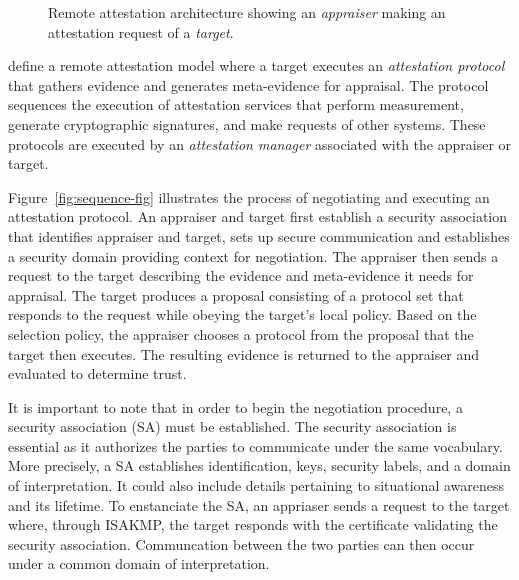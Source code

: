 \documentclass[sigconf,authordraft]{acmart}
\begin{document}
\begin{figure}[hbtp]
  \centering 
  \caption[Attestation architecture]{Remote attestation architecture
    showing an \emph{appraiser} making an attestation request of a
    \emph{target}.}
  \label{fig:architecture-fig}
\end{figure}

\citet{Coker::Principles-of-R,Coker:08:Attestation:-Ev} define a
remote attestation model where a target executes an \emph{attestation
  protocol} that gathers evidence and generates meta-evidence for
appraisal.  The protocol sequences the execution of attestation
services that perform measurement, generate cryptographic signatures,
and make requests of other systems. These protocols are executed by an
\emph{attestation manager} associated with the appraiser or target.


Figure~\ref{fig:sequence-fig} illustrates the process of negotiating
and executing an attestation protocol.  An appraiser and target first
establish a security association that identifies appraiser and target,
sets up secure communication and establishes a security domain
providing context for negotiation.  The appraiser then sends a request
to the target describing the evidence and meta-evidence it needs for
appraisal.  The target produces a proposal consisting of a protocol
set that responds to the request while obeying the target's local
policy. Based on the selection policy, the appraiser chooses a protocol from the proposal that the
target then executes.  The resulting evidence is returned to the
appraiser and evaluated to determine trust.


It is important to note that in order to begin the negotiation
procedure, a security association (SA) must be established. The
security association is essential as it authorizes the parties to
communicate under the same vocabulary. More precisely, a SA
establishes identification, keys, security labels, and a domain of
interpretation. It could also include details pertaining to
situational awareness and its lifetime. To enstanciate the SA, an
appriaser sends a request to the target where, through ISAKMP, the
target responds with the certificate validating the security
association. Communcation between the two parties can then occur under
a common domain of interpretation.
\end{document}
